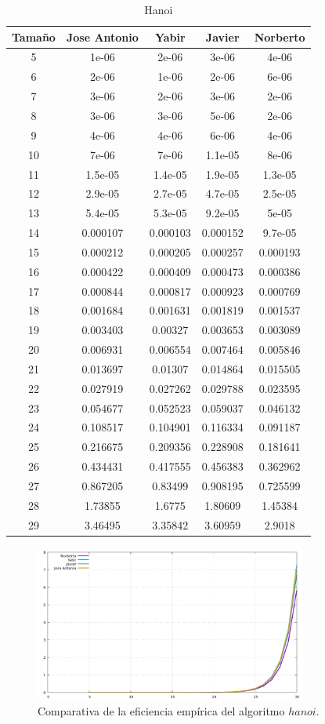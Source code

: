 \documentclass[11pt,a4paper]{article}
\begin{document}
\begin{table}[h]
	\centering
	\caption{Hanoi}
	\begin{tabular}{ | c | c  | c | c | c | }
		\hline
		Tama\~no & Jose Antonio & Yabir & Javier & Norberto\\ 
		\hline
		5	&	1e-06	&	2e-06	&	3e-06	&	4e-06	\\
		6	&	2e-06	&	1e-06	&	2e-06	&	6e-06	\\
		7	&	3e-06	&	2e-06	&	3e-06	&	2e-06	\\
		8	&	3e-06	&	3e-06	&	5e-06	&	2e-06	\\
		9	&	4e-06	&	4e-06	&	6e-06	&	4e-06	\\
		10	&	7e-06	&	7e-06	&	1.1e-05	&	8e-06	\\
		11	&	1.5e-05	&	1.4e-05	&	1.9e-05	&	1.3e-05	\\
		12	&	2.9e-05	&	2.7e-05	&	4.7e-05	&	2.5e-05	\\
		13	&	5.4e-05	&	5.3e-05	&	9.2e-05	&	5e-05	\\
		14	&	0.000107	&	0.000103	&	0.000152	&	9.7e-05	\\
		15	&	0.000212	&	0.000205	&	0.000257	&	0.000193	\\
		16	&	0.000422	&	0.000409	&	0.000473	&	0.000386	\\
		17	&	0.000844	&	0.000817	&	0.000923	&	0.000769	\\
		18	&	0.001684	&	0.001631	&	0.001819	&	0.001537	\\
		19	&	0.003403	&	0.00327	&	0.003653	&	0.003089	\\
		20	&	0.006931	&	0.006554	&	0.007464	&	0.005846	\\
		21	&	0.013697	&	0.01307	&	0.014864	&	0.015505	\\
		22	&	0.027919	&	0.027262	&	0.029788	&	0.023595	\\
		23	&	0.054677	&	0.052523	&	0.059037	&	0.046132	\\
		24	&	0.108517	&	0.104901	&	0.116334	&	0.091187	\\
		25	&	0.216675	&	0.209356	&	0.228908	&	0.181641	\\
		26	&	0.434431	&	0.417555	&	0.456383	&	0.362962	\\
		27	&	0.867205	&	0.83499	&	0.908195	&	0.725599	\\
		28	&	1.73855	&	1.6775	&	1.80609	&	1.45384	\\
		29	&	3.46495	&	3.35842	&	3.60959	&	2.9018	\\
		\hline
	\end{tabular}
\end{table}

\begin{figure}[H]
	\centering
	\includegraphics[width=0.8\textwidth]{../plots/hanoi}
	\caption{Comparativa de la eficiencia empírica del algoritmo $hanoi$.}
\end{figure}
\end{document}
